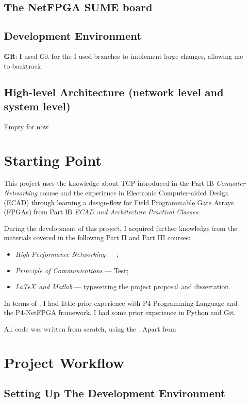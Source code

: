 	\subsection{The NetFPGA SUME board}
	
	\subsection{Development Environment}
	\textbf{Git}: I used Git for the I used branches to implement large changes, allowing me to backtrack
	
	\subsection{High-level Architecture (network level and system level)}
	Empty for now
	
\section{Starting Point}
This project uses the knowledge about TCP introduced in the Part IB \textit{Computer Networking} course and the experience in Electronic Computer-aided Design (ECAD) through learning a design-flow for Field Programmable Gate Arrays (FPGAs) from Part IB \textit{ECAD and Architecture Practical Classes}.

During the development of this project, I acquired further knowledge from the materials covered in the following Part II and Part III courses:%

\begin{itemize}[itemsep=4pt]
	\item \textit{High Performance Networking} --- ;%
	\item \textit{Principle of Communications} --- Test;%
	\item \textit{\LaTeX \ and Matlab} --- typesetting the project proposal and dissertation.%
\end{itemize}

In terms of , I had little prior experience with P4 Programming Language and the P4-NetFPGA framework. I had some prior experience in Python and Git.

All code was written from scratch, using the . Apart from 

\section{Project Workflow}
\subsection{Setting Up The Development Environment}
